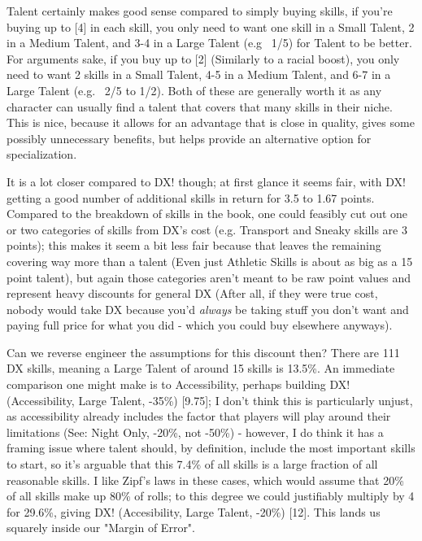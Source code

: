 \begin{multicols*}{2}
	Talent certainly makes good sense compared to simply buying skills, if you're buying up to [4] in each skill, you only need to want one skill in a Small Talent, 2 in a Medium Talent, and 3-4 in a Large Talent (e.g ~1/5) for Talent to be better. For arguments sake, if you buy up to [2] (Similarly to a racial boost), you only need to want 2 skills in a Small Talent, 4-5 in a Medium Talent, and 6-7 in a Large Talent (e.g. ~2/5 to 1/2). Both of these are generally worth it as any character can usually find a talent that covers that many skills in their niche. This is nice, because it allows for an advantage that is close in quality, gives some possibly unnecessary benefits, but helps provide an alternative option for specialization.
	
	It is a lot closer compared to DX! though; at first glance it seems fair, with DX! getting a good number of additional skills in return for 3.5 to 1.67 points. Compared to the breakdown of skills in the book, one could feasibly cut out one or two categories of skills from DX's cost (e.g. Transport and Sneaky skills are 3 points); this makes it seem a bit less fair because that leaves the remaining covering way more than a talent (Even just Athletic Skills is about as big as a 15 point talent), but again those categories aren't meant to be raw point values and represent heavy discounts for general DX (After all, if they were true cost, nobody would take DX because you'd \textit{always} be taking stuff you don't want and paying full price for what you did - which you could buy elsewhere anyways).
	
	Can we reverse engineer the assumptions for this discount then? There are 111 DX skills, meaning a Large Talent of around 15 skills is 13.5\%. An immediate comparison one might make is to Accessibility, perhaps building DX! (Accessibility, Large Talent, -35\%) [9.75]; I don't think this is particularly unjust, as accessibility already includes the factor that players will play around their limitations (See: Night Only, -20\%, not -50\%) - however, I do think it has a framing issue where talent should, by definition, include the most important skills to start, so it's arguable that this 7.4\% of all skills is a large fraction of all reasonable skills. I like Zipf's laws in these cases, which would assume that 20\% of all skills make up 80\% of rolls; to this degree we could justifiably multiply by 4 for 29.6\%, giving DX! (Accesibility, Large Talent, -20\%) [12]. This lands us squarely inside our "Margin of Error".
	

\end{multicols*}
